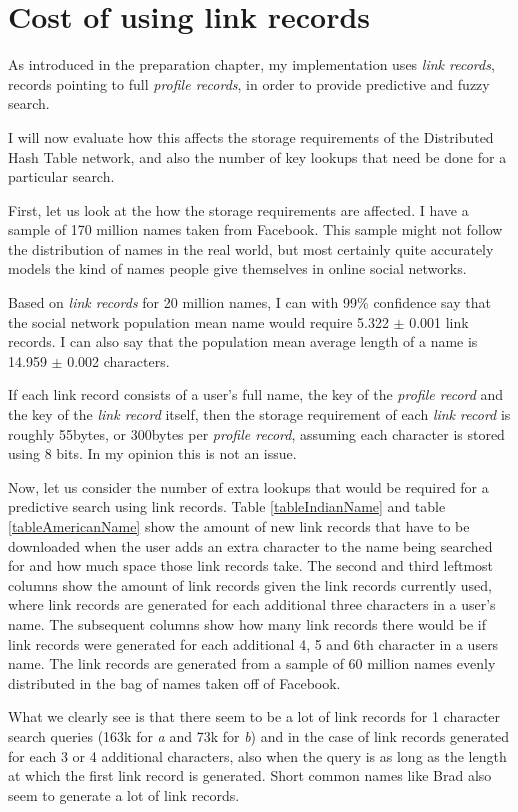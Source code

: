 \section{Cost of using link records}
As introduced in the preparation chapter, my implementation uses \emph{link records}, records pointing to full \emph{profile records}, in order to provide predictive and fuzzy search.

I will now evaluate how this affects the storage requirements of the Distributed Hash Table network, and also the number of key lookups that need be done for a particular search.

First, let us look at the how the storage requirements are affected.
I have a sample of 170 million names taken from Facebook. This sample might not follow the distribution of names in the real world, but most certainly quite accurately models the kind of names people give themselves in online social networks.

Based on \emph{link records} for 20 million names, I can with 99\% confidence say that the social network population mean name would require 5.322 $\pm$ 0.001 link records. I can also say that the population mean average length of a name is 14.959 $\pm$ 0.002 characters.

If each link record consists of a user's full name, the key of the \emph{profile record} and the key of the \emph{link record} itself, then the storage requirement of each \emph{link record} is roughly 55bytes, or 300bytes per \emph{profile record}, assuming each character is stored using 8 bits.
In my opinion this is not an issue.

Now, let us consider the number of extra lookups that would be required for a predictive search using link records. Table \ref{tableIndianName} and table \ref{tableAmericanName} show the amount of new link records that have to be downloaded when the user adds an extra character to the name being searched for and how much space those link records take. The second and third leftmost columns show the amount of link records given the link records currently used, where link records are generated for each additional three characters in a user's name. The subsequent columns show how many link records there would be if link records were generated for each additional 4, 5 and 6th character in a users name.
The link records are generated from a sample of 60 million names evenly distributed in the bag of names taken off of Facebook.

What we clearly see is that there seem to be a lot of link records for 1 character search queries (163k for \emph{a} and 73k for \emph{b}) and in the case of link records generated for each 3 or 4 additional characters, also when the query is as long as the length at which the first link record is generated. Short common names like Brad also seem to generate a lot of link records.

